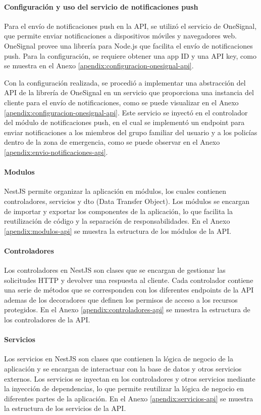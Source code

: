 \paragraph{Configuración y uso del servicio de notificaciones push}
Para el envío de notificaciones push en la API, se utilizó el servicio de OneSignal, que permite enviar notificaciones a dispositivos
móviles y navegadores web. OneSignal provee una librería para Node.js que facilita el envío de notificaciones push. Para la configuración,
se requiere obtener una app ID y una API key, como se muestra en el Anexo \ref{apendix:configuracion-onesignal-api}.
\bigbreak

Con la configuración realizada, se procedió a implementar una abstracción del API de la librería de OneSignal en un servicio que proporciona
una instancia del cliente para el envío de notificaciones, como se puede visualizar en el Anexo \ref{apendix:configuracion-onesignal-api}. Este servicio
se inyectó en el controlador del módulo de notificaciones push, en el cual se implementó un endpoint para enviar notificaciones a los miembros
del grupo familiar del usuario y a los policías dentro de la zona de emergencia, como se puede observar en el Anexo \ref{apendix:envio-notificaciones-api}.

\paragraph{Modulos}
NestJS permite organizar la aplicación en módulos, los cuales contienen controladores, servicios y dto (Data Transfer Object). Los módulos se encargan
de importar y exportar los componentes de la aplicación, lo que facilita la reutilización de código y la separación de responsabilidades. En el Anexo
\ref{apendix:modulos-api} se muestra la estructura de los módulos de la API.

\paragraph{Controladores}
Los controladores en NestJS son clases que se encargan de gestionar las solicitudes HTTP y devolver una respuesta al cliente. Cada controlador
contiene una serie de métodos que se corresponden con los diferentes endpoints de la API ademas de los decoradores que definen los permisos de
acceso a los recursos protegidos. En el Anexo \ref{apendix:controladores-api} se muestra la estructura de los controladores de la API.

\paragraph{Servicios}
Los servicios en NestJS son clases que contienen la lógica de negocio de la aplicación y se encargan de interactuar con la base de datos y otros
servicios externos. Los servicios se inyectan en los controladores y otros servicios mediante la inyección de dependencias, lo que permite reutilizar
la lógica de negocio en diferentes partes de la aplicación. En el Anexo \ref{apendix:servicios-api} se muestra la estructura de los servicios de la API.

